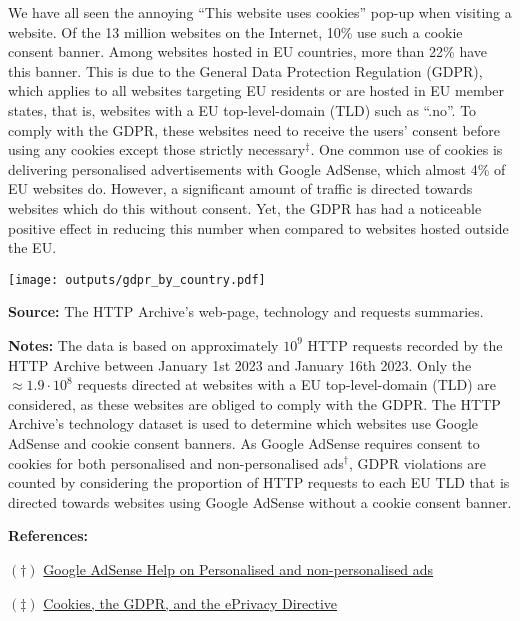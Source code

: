 \documentclass[border=0mm]{article}
\begin{document}
\begin{minipage}{0.5\textwidth}
\small
\vspace*{0.2cm}
We have all seen the annoying ``This website uses cookies'' pop-up when visiting a website.
Of the 13 million websites on the Internet, 10\% use such a cookie consent banner. Among
websites hosted in EU countries, more than 22\% have this banner.
This is due to the General Data Protection Regulation (GDPR), which
applies to all websites targeting EU residents
or are hosted in EU member states, that is, websites with a EU top-level-domain (TLD)
such as ``.no''. To comply with the GDPR, these websites need to receive the users' consent
before using any cookies except those strictly necessary$^\ddagger$. One common use of cookies is delivering
personalised advertisements with Google AdSense, which almost 4\% of EU websites do.
However, a significant amount of traffic is directed towards websites which do this without
consent. Yet, the GDPR has had a noticeable positive effect in reducing this number when compared
to websites hosted outside the EU.

\vspace*{.2cm}

\texttt{[image: outputs/gdpr\_by\_country.pdf]}

{\small\linespread{.1}\selectfont\fontsize{8pt}{.1cm}\selectfont
\textbf{Source:} The HTTP Archive's web-page, technology and requests summaries.

\textbf{Notes:} The data is based on approximately $10^9$ HTTP requests recorded by the HTTP Archive
    between January 1st 2023 and January 16th 2023. Only the $\approx 1.9 \cdot 10^8$ requests
    directed at websites with a EU top-level-domain (TLD) are considered, as these websites are
    obliged to comply with the GDPR.
    The HTTP Archive's technology dataset is used
    to determine which websites use Google AdSense and cookie consent banners. As Google AdSense
    requires consent to cookies for both personalised and non-personalised ads$^{\dagger}$,
    GDPR violations are counted by considering the proportion of HTTP requests to each EU TLD that
    is directed towards websites using Google AdSense without a cookie consent banner.
\par}


\begin{references}[width=1\textwidth,arc=10pt,auto outer arc]
\textbf{References:}

$(\dagger)$ \href{https://support.google.com/adsense/answer/9007336}{\color{dark} Google AdSense Help on Personalised and non-personalised ads}

$(\ddagger)$ \href{https://gdpr.eu/cookies/}{\color{dark} Cookies, the GDPR, and the ePrivacy Directive}
\end{references}



\end{minipage}%
\end{document}
